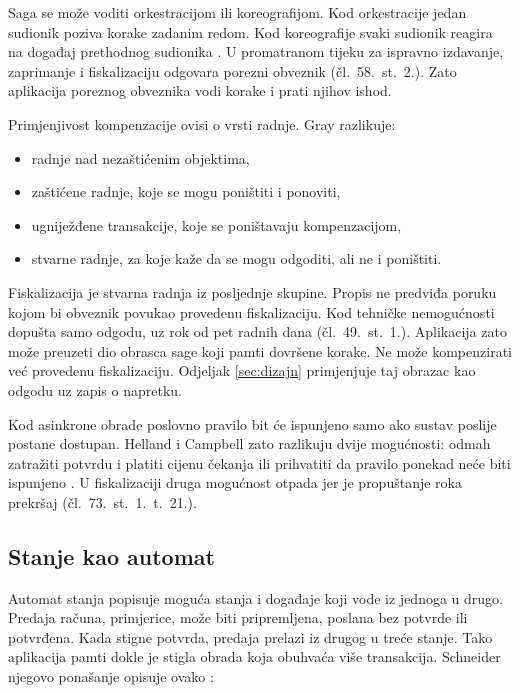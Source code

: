 Saga se može voditi orkestracijom ili koreografijom. Kod orkestracije jedan
sudionik poziva korake zadanim redom. Kod koreografije svaki sudionik reagira
na događaj prethodnog sudionika \cite{megargel2021orchestration}. U
promatranom tijeku za ispravno izdavanje, zaprimanje i fiskalizaciju odgovara
porezni obveznik (čl.~58.~st.~2.). Zato aplikacija poreznog obveznika vodi
korake i prati njihov ishod.

Primjenjivost kompenzacije ovisi o vrsti radnje. Gray razlikuje:

\begin{itemize}[nosep, leftmargin=1.4cm]
  \item radnje nad nezaštićenim objektima,
  \item zaštićene radnje, koje se mogu poništiti i ponoviti,
  \item ugniježđene transakcije, koje se poništavaju kompenzacijom,
  \item stvarne radnje, za koje kaže da se mogu odgoditi, ali ne i poništiti.
\end{itemize}

Fiskalizacija je stvarna radnja iz posljednje skupine. Propis ne predviđa
poruku kojom bi obveznik povukao provedenu fiskalizaciju. Kod tehničke
nemogućnosti dopušta samo odgodu, uz rok od pet radnih dana
(čl.~49.~st.~1.). Aplikacija zato može preuzeti dio obrasca sage koji pamti
dovršene korake. Ne može kompenzirati već provedenu fiskalizaciju. Odjeljak
\ref{sec:dizajn} primjenjuje taj obrazac kao odgodu uz zapis o napretku.

Kod asinkrone obrade poslovno pravilo bit će ispunjeno samo ako sustav poslije
postane dostupan. Helland i Campbell zato razlikuju dvije mogućnosti: odmah
zatražiti potvrdu i platiti cijenu čekanja ili prihvatiti da pravilo ponekad
neće biti ispunjeno \cite{helland2009quicksand}. U fiskalizaciji druga
mogućnost otpada jer je propuštanje roka prekršaj
(čl.~73.~st.~1.~t.~21.).

\subsection{Stanje kao automat}
\label{sec:automat}

Automat stanja popisuje moguća stanja i događaje koji vode iz jednoga u drugo.
Predaja računa, primjerice, može biti pripremljena, poslana bez potvrde ili
potvrđena. Kada stigne potvrda, predaja prelazi iz drugog u treće stanje.
Tako aplikacija pamti dokle je stigla obrada koja obuhvaća više transakcija.
Schneider njegovo ponašanje opisuje ovako \cite{schneider1990statemachine}:

